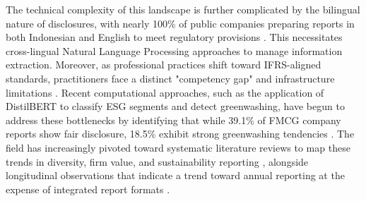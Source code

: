 \documentclass[english, online, cse, master]{dithesis}
\begin{document}
The technical complexity of this landscape is further complicated by the bilingual nature of disclosures, with nearly 100\% of public companies preparing reports in both Indonesian and English to meet regulatory provisions  \parencite{tri_siwi_nugrahani_056a6914}. This necessitates cross-lingual Natural Language Processing approaches to manage information extraction. Moreover, as professional practices shift toward IFRS-aligned standards, practitioners face a distinct "competency gap" and infrastructure limitations  \parencite{amrie_firmansyah_fd5249a2}. Recent computational approaches, such as the application of DistilBERT to classify ESG segments and detect greenwashing, have begun to address these bottlenecks by identifying that while 39.1\% of FMCG company reports show fair disclosure, 18.5\% exhibit strong greenwashing tendencies  \parencite{anisa_kusuma_putri_4109a23b}. The field has increasingly pivoted toward systematic literature reviews to map these trends in diversity, firm value, and sustainability reporting  \parencite{irma_hidayati_373b816a}, alongside longitudinal observations that indicate a trend toward annual reporting at the expense of integrated report formats  \parencite{kostiantyn_bezverkhyi_e3819b1b}.
\end{document}
